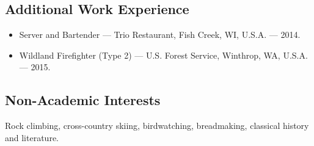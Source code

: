 \documentclass[10pt]{article}
\begin{document}
\subsection*{\textbf{Additional Work Experience}}
\begin{itemize}[label={}]
	\item Server and Bartender --- Trio Restaurant, Fish Creek, WI, U.S.A. --- 2014.
	\item Wildland Firefighter (Type 2) --- U.S. Forest Service, Winthrop, WA, U.S.A. --- 2015.
\end{itemize}


\subsection*{\textbf{Non-Academic Interests}} \hspace{5ex}
 Rock climbing, cross-country skiing, birdwatching, breadmaking, classical history and literature.

\end{document}
